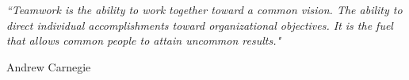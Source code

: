 \textit{``Teamwork is the ability to work together toward a common vision. The ability to direct individual accomplishments toward organizational objectives. It is the fuel that allows common people to attain uncommon results."}

\begin{flushright}
Andrew Carnegie
\end{flushright}